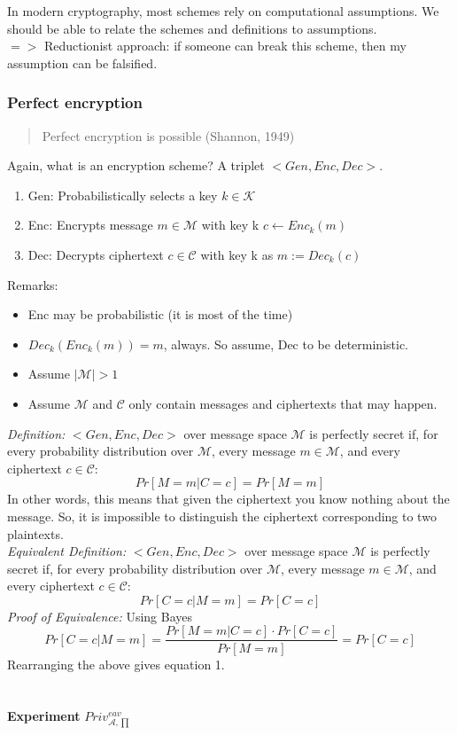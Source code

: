 \documentclass[11pt, oneside]{article}   	%
\begin{document}
In modern cryptography, most schemes rely on computational assumptions. We should be able to relate the schemes and definitions to assumptions. \\
$=>$ Reductionist approach: if someone can break this scheme, then my assumption can be falsified.
\subsubsection{Perfect encryption}
\begin{quote}
Perfect encryption is possible (Shannon, 1949)
\end{quote}
Again, what is an encryption scheme? A triplet $<Gen, Enc, Dec>$.
\begin{enumerate}
\item Gen: Probabilistically selects a key $k \in \mathcal{K}$
\item Enc: Encrypts message $m \in \mathcal{M}$ with key k $c \leftarrow Enc_k(m)$
\item Dec: Decrypts ciphertext $c \in \mathcal{C}$ with key k as $m := Dec_k(c)$
\end{enumerate}
Remarks:
\begin{itemize}
\item Enc may be probabilistic (it is most of the time)
\item $Dec_k(Enc_k(m))=m$, always. So assume, Dec to be deterministic.
\item Assume $|\mathcal{M}| > 1$
\item Assume $\mathcal{M}$ and $\mathcal{C}$ only contain messages and ciphertexts that may happen.
\end{itemize}
\emph{Definition:} $<Gen, Enc, Dec>$ over message space $\mathcal{M}$ is perfectly secret if, for every probability distribution over $\mathcal{M}$, every message $m \in \mathcal{M}$, and every ciphertext $c \in \mathcal{C}$:
\begin{equation}
Pr[M=m|C=c] = Pr[M=m]
\end{equation}
In other words, this means that given the ciphertext you know nothing about the message. So, it is impossible to distinguish the ciphertext corresponding to two plaintexts.\\
\emph{Equivalent Definition:} $<Gen, Enc, Dec>$ over message space $\mathcal{M}$ is perfectly secret if, for every probability distribution over $\mathcal{M}$, every message $m \in \mathcal{M}$, and every ciphertext $c \in \mathcal{C}$:
\begin{equation}
Pr[C=c|M=m] = Pr[C=c]
\end{equation}
\emph{Proof of Equivalence:} Using Bayes
\begin{equation}
Pr[C=c|M=m] = \frac{Pr[M=m|C=c] \cdot Pr[C=c]}{Pr[M=m]} = Pr[C=c]
\end{equation}
Rearranging the above gives equation 1.\\
\\
\\
\textbf{Experiment} $Priv_{\mathcal{A},\prod}^{eav}$
\end{document}
